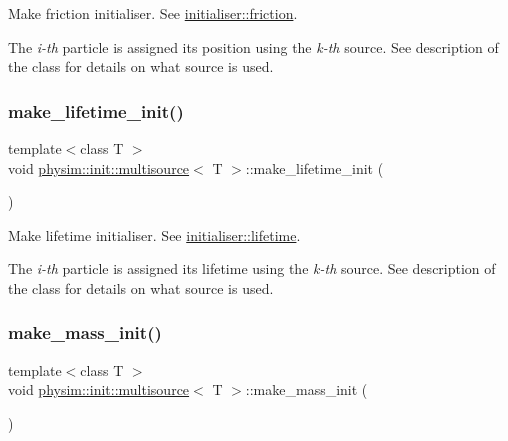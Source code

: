 Make friction initialiser. See \hyperlink{classphysim_1_1init_1_1initialiser_a47fdfedccb1be510ee3021749dfe06e6}{initialiser\+::friction}. 

The {\itshape i-\/th} particle is assigned its position using the {\itshape k-\/th} source. See description of the class for details on what source is used. \mbox{\label{classphysim_1_1init_1_1multisource_a5eac947010c79300e4aa80b374edd129}} 
\subsubsection{\texorpdfstring{make\+\_\+lifetime\+\_\+init()}{make\_lifetime\_init()}}
{\footnotesize\ttfamily template$<$class T $>$ \\
void \hyperlink{classphysim_1_1init_1_1multisource}{physim\+::init\+::multisource}$<$ T $>$\+::make\+\_\+lifetime\+\_\+init (\begin{DoxyParamCaption}{ }\end{DoxyParamCaption})}



Make lifetime initialiser. See \hyperlink{classphysim_1_1init_1_1initialiser_ac137b5089b9beca078e08b2bcdf0d54c}{initialiser\+::lifetime}. 

The {\itshape i-\/th} particle is assigned its lifetime using the {\itshape k-\/th} source. See description of the class for details on what source is used. \mbox{\label{classphysim_1_1init_1_1multisource_a6fe9dabcfe734fb68611d71de90157bb}} 
\subsubsection{\texorpdfstring{make\+\_\+mass\+\_\+init()}{make\_mass\_init()}}
{\footnotesize\ttfamily template$<$class T $>$ \\
void \hyperlink{classphysim_1_1init_1_1multisource}{physim\+::init\+::multisource}$<$ T $>$\+::make\+\_\+mass\+\_\+init (\begin{DoxyParamCaption}{ }\end{DoxyParamCaption})}



